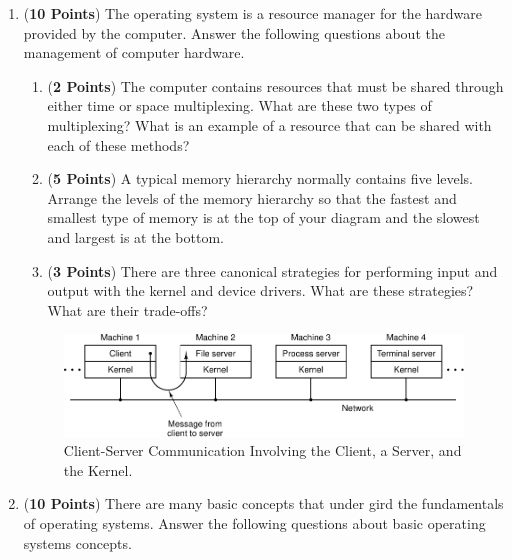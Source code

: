 \documentclass[12pt,epsf,psfig,graphics]{article}
\begin{document}
\begin{enumerate}
  
\item ({\bf 10 Points}) The operating system is a resource manager for the hardware provided by the computer.  Answer
  the following questions about the management of computer hardware.

  \begin{enumerate}
          
  \item ({\bf 2 Points}) The computer contains resources that must be shared through either time or space multiplexing.
    What are these two types of multiplexing? What is an example of a resource that can be shared with each of these
    methods?
   
  \item ({\bf 5 Points}) A typical memory hierarchy normally contains five levels.  Arrange the levels of the memory
    hierarchy so that the fastest and smallest type of memory is at the top of your diagram and the slowest and largest
    is at the bottom.
  
  \item ({\bf 3 Points}) There are three canonical strategies for performing input and output with the
    kernel and device drivers.  What are these strategies? What are their trade-offs?

  \end{enumerate}
        
\newpage

\begin{figure}[t]
  \centering
  \includegraphics{fig1-27}
  \caption{Client-Server Communication Involving the Client, a Server, and the Kernel.}
  \label{fig:clientserver}
\end{figure}

\item ({\bf 10 Points}) There are many basic concepts that under gird the fundamentals of operating systems.  Answer the
  following questions about basic operating systems concepts.

  \begin{enumerate}
          

\end{enumerate}
\end{enumerate}
\end{document}
